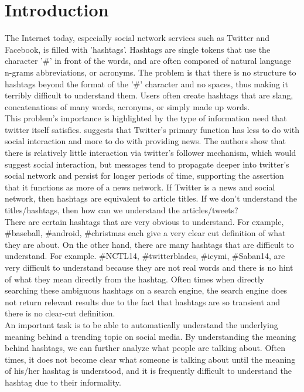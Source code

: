 \documentclass{sig-alternate}
\begin{document}
\section{Introduction}
The Internet today, especially social network services such as Twitter and Facebook, is filled with 'hashtags'. Hashtags are single tokens that use the character '\#' in front of the words, and are often composed of natural language n-grams abbreviations, or acronyms. The problem is that there is no structure to hashtags beyond the format of the '\#' character and no spaces, thus making it terribly difficult to understand them. Users often create hashtags that are slang, concatenations of many words, acronyms, or simply made up words.  \\
This problem's importance is highlighted by the type of information need that twitter itself satisfies.  \cite{twitternews} suggests that Twitter's primary function has less to do with social interaction and more to do with providing news.  The authors show that there is relatively little interaction via twitter's follower mechanism, which would suggest social interaction, but messages tend to propagate deeper into twitter's social network and persist for longer periods of time, supporting the assertion that it functions as more of a news network.  If Twitter is a news and social network, then hashtags are equivalent to article titles.  If we don't understand the titles/hashtags, then how can we understand the articles/tweets? \\
There are certain hashtags that are very obvious to understand. For example, \#baseball, \#android, \#christmas each give a very clear cut definition of what they are about. On the other hand, there are many hashtags that are difficult to understand. For example. \#NCTL14, \#twitterblades, \#icymi, \#Saban14, are very difficult to understand because they are not real words and there is no hint of what they mean directly from the hashtag. Often times when directly searching these ambiguous hashtags on a search engine, the search engine does not return relevant results due to the fact that hashtags are so transient and there is no clear-cut definition.\\
An important task is to be able to automatically understand the underlying meaning behind a trending topic on social media. By understanding the meaning behind hashtags, we can further analyze what people are talking about. Often times, it does not become clear what someone is talking about until the meaning of his/her hashtag is understood, and it is frequently difficult to understand the hashtag due to their informality.\\
\end{document}
